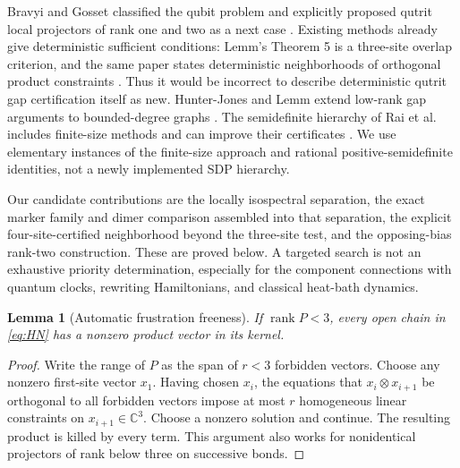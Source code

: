 \documentclass[11pt,a4paper]{article}
\newtheorem{lemma}[theorem]{Lemma}
\theoremstyle{remark}\newtheorem{remark}[theorem]{Remark}
\newcommand{\C}{\mathbb C}
\newcommand{\rank}{\operatorname{rank}}
\begin{document}
Bravyi and Gosset classified the qubit problem and explicitly proposed qutrit local projectors of rank one and two as a next case \cite{BG}. Existing methods already give deterministic sufficient conditions: Lemm's Theorem 5 is a three-site overlap criterion, and the same paper states deterministic neighborhoods of orthogonal product constraints \cite{Lemm}. Thus it would be incorrect to describe deterministic qutrit gap certification itself as new. Hunter-Jones and Lemm extend low-rank gap arguments to bounded-degree graphs \cite{HJL}. The semidefinite hierarchy of Rai et al. includes finite-size methods and can improve their certificates \cite{Rai}. We use elementary instances of the finite-size approach and rational positive-semidefinite identities, not a newly implemented SDP hierarchy.

Our candidate contributions are the locally isospectral separation, the exact marker family and dimer comparison assembled into that separation, the explicit four-site-certified neighborhood beyond the three-site test, and the opposing-bias rank-two construction. These are proved below. A targeted search is not an exhaustive priority determination, especially for the component connections with quantum clocks, rewriting Hamiltonians, and classical heat-bath dynamics.

\begin{lemma}[Automatic frustration freeness]\label{lem:ff}
If $\rank P<3$, every open chain in \eqref{eq:HN} has a nonzero product vector in its kernel.
\end{lemma}
\begin{proof}
Write the range of $P$ as the span of $r<3$ forbidden vectors. Choose any nonzero first-site vector $x_1$. Having chosen $x_i$, the equations that $x_i\otimes x_{i+1}$ be orthogonal to all forbidden vectors impose at most $r$ homogeneous linear constraints on $x_{i+1}\in\C^3$. Choose a nonzero solution and continue. The resulting product is killed by every term. This argument also works for nonidentical projectors of rank below three on successive bonds.
\end{proof}
\end{document}
